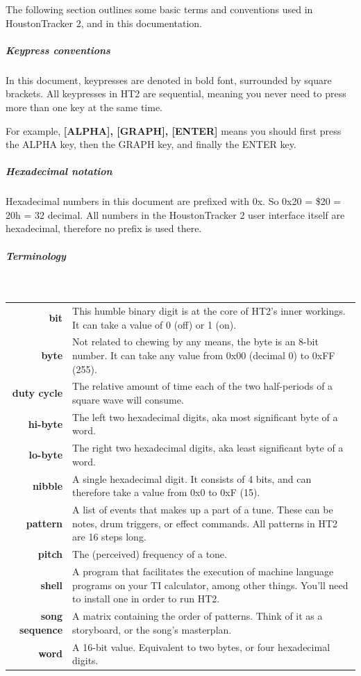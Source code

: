 \documentclass[12pt]{report}	%
\begin{document}
The following section outlines some basic terms and conventions used in HoustonTracker 2, and in this documentation.

\subparagraph{Keypress conventions}
In this document, keypresses are denoted in bold font, surrounded by square brackets. All keypresses in HT2 are sequential, meaning you never need to press more than one key at the same time.

For example, \textbf{[ALPHA], [GRAPH], [ENTER]} means you should first press the ALPHA key, then the GRAPH key, and finally the ENTER key.

\subparagraph{Hexadecimal notation}
Hexadecimal numbers in this document are prefixed with 0x. So 0x20 = \$20 = 20h = 32 decimal.
All numbers in the HoustonTracker 2 user interface itself are hexadecimal, therefore no prefix is used there.

\newpage
\subparagraph{Terminology} ~\\
 
\begin{tabularx}{\textwidth}{r X}
\textbf{bit} & This humble binary digit is at the core of HT2's inner workings. It can take a value of 0 (off) or 1 (on). \\
\textbf{byte} & Not related to chewing by any means, the byte is an 8-bit number. It can take any value from 0x00 (decimal 0) to 0xFF (255). \\
\textbf{duty cycle} & The relative amount of time each of the two half-periods of a square wave will consume. \\
\textbf{hi-byte} & The left two hexadecimal digits, aka most significant byte of a word. \\
\textbf{lo-byte} & The right two hexadecimal digits, aka least significant byte of a word. \\
\textbf{nibble} & A single hexadecimal digit. It consists of 4 bits, and can therefore take a value from 0x0 to 0xF (15). \\
\textbf{pattern} & A list of events that makes up a part of a tune. These can be notes, drum triggers, or effect commands. All patterns in HT2 are 16 steps long. \\
\textbf{pitch} &The (perceived) frequency of a tone. \\
\textbf{shell} &A program that facilitates the execution of machine language programs on your TI calculator, among other things. You'll need to install one in order to run HT2. \\
\textbf{song sequence} & A matrix containing the order of patterns. Think of it as a storyboard, or the song's masterplan. \\
\textbf{word} & A 16-bit value. Equivalent to two bytes, or four hexadecimal digits. \\
\end{tabularx}
\end{document}
